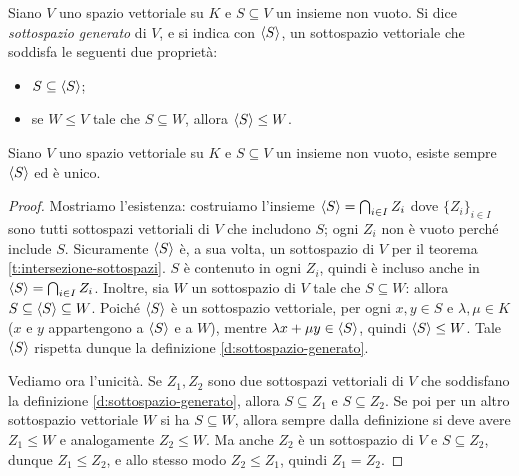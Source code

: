 \begin{definizione} \label{d:sottospazio-generato}
	Siano $V$ uno spazio vettoriale su $K$ e $S\subseteq V$ un insieme non vuoto.
	Si dice \emph{sottospazio generato} di $V$, e si indica con $\left\langle{S}\right\rangle$, un sottospazio vettoriale che soddisfa le seguenti due proprietà:
	\begin{itemize}
		\item $S\subseteq\left\langle{S}\right\rangle$;
		\item se $W\leq V$ tale che $S\subseteq W$, allora $\left\langle{S}\right\rangle\leq W$.
	\end{itemize}
\end{definizione}
\begin{teorema} \label{t:unicità-span}
	Siano $V$ uno spazio vettoriale su $K$ e $S\subseteq V$ un insieme non vuoto, esiste sempre $\left\langle{S}\right\rangle$ ed è unico.
\end{teorema}
\begin{proof}
	Mostriamo l'esistenza: costruiamo l'insieme $\left\langle{S}\right\rangle=\bigcap_{i\in I}Z_i$ dove $\{Z_i\}_{i\in I}$ sono tutti sottospazi vettoriali di $V$ che includono $S$; ogni $Z_i$ non è vuoto perché include $S$.
	Sicuramente $\left\langle{S}\right\rangle$ è, a sua volta, un sottospazio di $V$ per il teorema \ref{t:intersezione-sottospazi}.
	$S$ è contenuto in ogni $Z_i$, quindi è incluso anche in $\left\langle{S}\right\rangle=\bigcap_{i\in I}Z_i$.
	Inoltre, sia $W$ un sottospazio di $V$ tale che $S\subseteq W$: allora $S\subseteq\left\langle{S}\right\rangle\subseteq W$.
	Poiché $\left\langle{S}\right\rangle$ è un sottospazio vettoriale, per ogni $x,y\in S$ e $\lambda,\mu\in K$ ($x$ e $y$ appartengono a $\left\langle{S}\right\rangle$ e a $W$), mentre $\lambda x+\mu y\in\left\langle{S}\right\rangle$, quindi $\left\langle{S}\right\rangle\leq W$.
	Tale $\left\langle{S}\right\rangle$ rispetta dunque la definizione \ref{d:sottospazio-generato}.

	Vediamo ora l'unicità.
	Se $Z_1,Z_2$ sono due sottospazi vettoriali di $V$ che soddisfano la definizione \ref{d:sottospazio-generato}, allora $S\subseteq Z_1$ e $S\subseteq Z_2$.
	Se poi per un altro sottospazio vettoriale $W$ si ha $S\subseteq W$, allora sempre dalla definizione si deve avere $Z_1\le W$ e analogamente $Z_2\le W$.
	Ma anche $Z_2$ è un sottospazio di $V$ e $S\subseteq Z_2$, dunque $Z_1\le Z_2$, e allo stesso modo $Z_2\le Z_1$, quindi $Z_1=Z_2$.
\end{proof}

